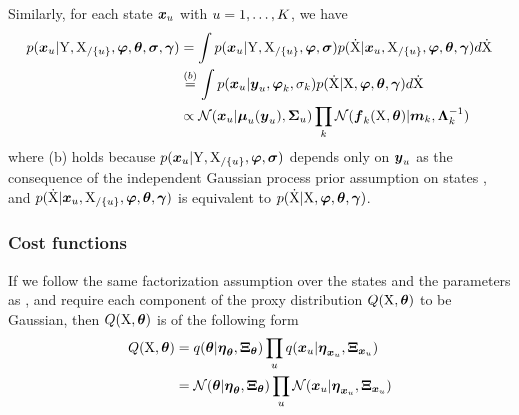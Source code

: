 Similarly, for each state $\boldsymbol{x}_{u}$ with $u = 1,\dots,K$, we have
\begin{align}
    p(\dymxk{u}\vert\dymY,\dymXwithoutk{u},\dymphi,\dymtheta,\dymsigma,\dymgamma)  
    & =     
    \int{
        p(\dymxk{u}\vert\dymY,\dymXwithoutk{u},\dymphi,\dymsigma) p(\dymdX\vert\dymxk{u},\dymXwithoutk{u},\dymphi,\dymtheta,\dymgamma)d\dymdX}
    \nonumber
    \\
    & \stackrel{(b)}{=}             
    \int{
        p(\dymxk{u}\vert\dymyk{u},\dymphik{k},\dymsigmak{k})
        p(\dymdX\vert\dymX,\dymphi,\dymtheta,\dymgamma)d\dymdX}
    \nonumber
    \\  
    & \propto
    \mathcal{N}(\dymxk{u}\vert\dymmuk{u},\dymSigmak{u})\prod_k{\mathcal{N}(\dymfkX{k}\vert\dymmk{k},\dyminvLambdak{k})}
    \label{eq-laplace-xu-objective}
\end{align}
where (b) holds because $p(\boldsymbol{x}_{u}\vert\mathrm{Y},\mathrm{X}_{/\{u\}},\boldsymbol{\varphi},\boldsymbol{\sigma})$ depends only on $\boldsymbol{y}_{u}$ as the consequence of the independent Gaussian process prior assumption on states , and $p(\mathrm{\dot{X}}\vert\boldsymbol{x}_{u},\mathrm{X}_{/\{u\}},\boldsymbol{\varphi},\boldsymbol{\theta},\boldsymbol{\gamma})$ is equivalent to $p(\mathrm{\dot{X}}\vert\mathrm{X},\boldsymbol{\varphi},\boldsymbol{\theta},\boldsymbol{\gamma})$.

\subsubsection*{Cost functions}

If we follow the same factorization assumption over the states and the parameters as \cite{gorbach2017scalable}, and require each component of the proxy distribution $Q(\mathrm{X}, \boldsymbol{\theta})$ to be Gaussian, then $Q(\mathrm{X}, \boldsymbol{\theta})$ is of the following form
\begin{align}
    Q(\mathrm{X},\boldsymbol{\theta}) 
    & = 
    q(\boldsymbol{\theta}\vert\boldsymbol{\eta}_{\boldsymbol{\theta}},\boldsymbol{\Xi}_{\boldsymbol{\theta}})\prod_u{
        q(\boldsymbol{x}_{u}\vert\boldsymbol{\eta}_{\boldsymbol{x}_{u}},\boldsymbol{\Xi}_{\boldsymbol{x}_{u}})}
    \nonumber
    \\
    & = \mathcal{N}(\boldsymbol{\theta}\vert\boldsymbol{\eta}_{\boldsymbol{\theta}}, \boldsymbol{\Xi}_{\boldsymbol{\theta}})\prod_u{
        \mathcal{N}(\boldsymbol{x}_{u}\vert\boldsymbol{\eta}_{\boldsymbol{x}_{u}},\boldsymbol{\Xi}_{\boldsymbol{x}_{u}})
    }
\end{align}

